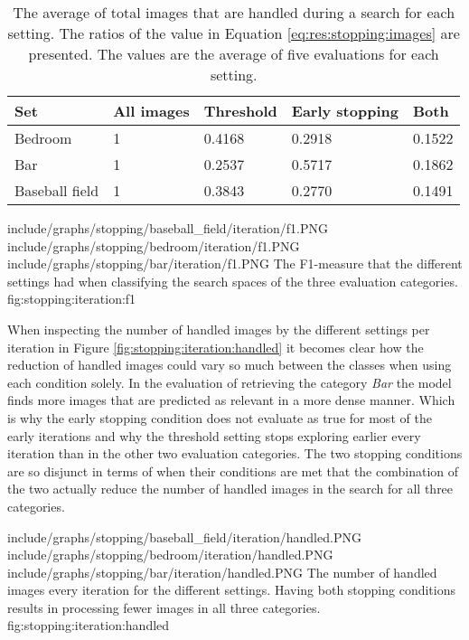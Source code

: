 \begin{table}
\centering
\begin{tabular}{l | p{2.6cm} p{2.6cm} p{3.2cm} p{1.6cm} }
\textbf{Set} & \textbf{All images} & \textbf{Threshold} & \textbf{Early stopping} & \textbf{Both} \\\hline
Bedroom & 1 & 0.4168 & 0.2918 & 0.1522 \\
Bar & 1 & 0.2537 & 0.5717 & 0.1862 \\
Baseball field & 1 & 0.3843 & 0.2770 & 0.1491 
\end{tabular}
\caption{The average of total images that are handled during a search for each setting. The ratios of the value in Equation \ref{eq:res:stopping:images} are presented. The values are the average of five evaluations for each setting.}
\label{table:res:stopping:images}
\end{table}

\tripfigurenear
{include/graphs/stopping/baseball_field/iteration/f1.PNG}
{include/graphs/stopping/bedroom/iteration/f1.PNG}
{include/graphs/stopping/bar/iteration/f1.PNG}
{The F1-measure that the different settings had when classifying the search spaces of the three evaluation categories.}
{fig:stopping:iteration:f1}

When inspecting the number of handled images by the different settings per iteration in Figure \ref{fig:stopping:iteration:handled} it becomes clear how the reduction of handled images could vary so much between the classes when using each condition solely. In the evaluation of retrieving the category \emph{Bar} the model finds more images that are predicted as relevant in a more dense manner. Which is why the early stopping condition does not evaluate as true for most of the early iterations and why the threshold setting stops exploring earlier every iteration than in the other two evaluation categories. The two stopping conditions are so disjunct in terms of when their conditions are met that the combination of the two actually reduce the number of handled images in the search for all three categories. 

\tripfigurenear
{include/graphs/stopping/baseball_field/iteration/handled.PNG}
{include/graphs/stopping/bedroom/iteration/handled.PNG}
{include/graphs/stopping/bar/iteration/handled.PNG}
{The number of handled images every iteration for the different settings. Having both stopping conditions results in processing fewer images in all three categories.}
{fig:stopping:iteration:handled}


